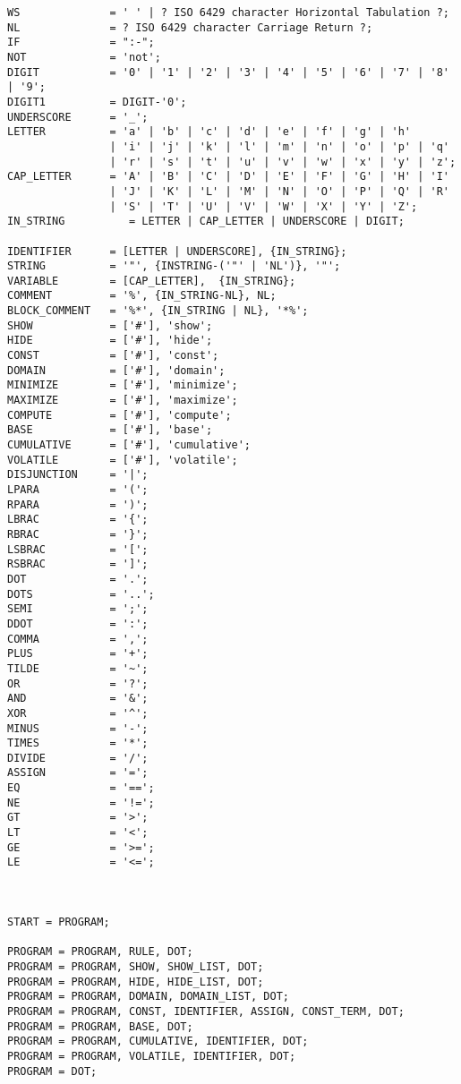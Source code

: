 		
\begin{verbatim}
WS              = ' ' | ? ISO 6429 character Horizontal Tabulation ?;
NL              = ? ISO 6429 character Carriage Return ?;
IF              = ":-";
NOT             = 'not';
DIGIT           = '0' | '1' | '2' | '3' | '4' | '5' | '6' | '7' | '8' | '9';
DIGIT1          = DIGIT-'0';
UNDERSCORE      = '_';
LETTER          = 'a' | 'b' | 'c' | 'd' | 'e' | 'f' | 'g' | 'h'
                | 'i' | 'j' | 'k' | 'l' | 'm' | 'n' | 'o' | 'p' | 'q'
                | 'r' | 's' | 't' | 'u' | 'v' | 'w' | 'x' | 'y' | 'z';
CAP_LETTER      = 'A' | 'B' | 'C' | 'D' | 'E' | 'F' | 'G' | 'H' | 'I'
                | 'J' | 'K' | 'L' | 'M' | 'N' | 'O' | 'P' | 'Q' | 'R'
                | 'S' | 'T' | 'U' | 'V' | 'W' | 'X' | 'Y' | 'Z';
IN_STRING          = LETTER | CAP_LETTER | UNDERSCORE | DIGIT;

IDENTIFIER      = [LETTER | UNDERSCORE], {IN_STRING};
STRING          = '"', {INSTRING-('"' | 'NL')}, '"';
VARIABLE        = [CAP_LETTER],  {IN_STRING};
COMMENT         = '%', {IN_STRING-NL}, NL;
BLOCK_COMMENT   = '%*', {IN_STRING | NL}, '*%';
SHOW            = ['#'], 'show';
HIDE            = ['#'], 'hide';
CONST           = ['#'], 'const';
DOMAIN          = ['#'], 'domain';
MINIMIZE        = ['#'], 'minimize';
MAXIMIZE        = ['#'], 'maximize';
COMPUTE         = ['#'], 'compute';
BASE            = ['#'], 'base';
CUMULATIVE      = ['#'], 'cumulative';
VOLATILE        = ['#'], 'volatile';
DISJUNCTION     = '|';
LPARA           = '(';
RPARA           = ')';
LBRAC           = '{';
RBRAC           = '}';
LSBRAC          = '[';
RSBRAC          = ']';
DOT             = '.';
DOTS            = '..';
SEMI            = ';';
DDOT            = ':';
COMMA           = ',';
PLUS            = '+';
TILDE           = '~';
OR              = '?';
AND             = '&';
XOR             = '^';
MINUS           = '-';
TIMES           = '*';
DIVIDE          = '/';
ASSIGN          = '=';
EQ              = '==';
NE              = '!=';
GT              = '>';
LT              = '<';
GE              = '>=';
LE              = '<=';



START = PROGRAM;

PROGRAM = PROGRAM, RULE, DOT;
PROGRAM = PROGRAM, SHOW, SHOW_LIST, DOT;
PROGRAM = PROGRAM, HIDE, HIDE_LIST, DOT;
PROGRAM = PROGRAM, DOMAIN, DOMAIN_LIST, DOT;
PROGRAM = PROGRAM, CONST, IDENTIFIER, ASSIGN, CONST_TERM, DOT;
PROGRAM = PROGRAM, BASE, DOT;
PROGRAM = PROGRAM, CUMULATIVE, IDENTIFIER, DOT;
PROGRAM = PROGRAM, VOLATILE, IDENTIFIER, DOT;
PROGRAM = DOT;


\end{verbatim}
